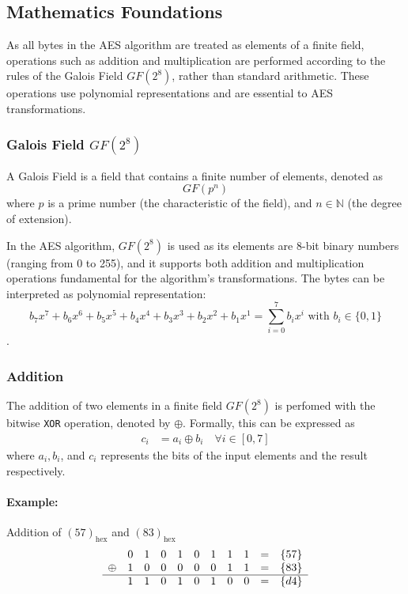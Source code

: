 \subsection{Mathematics Foundations}

As all bytes in the \gls{AES} algorithm are treated as elements of a finite field, operations such as addition and multiplication are performed according to the rules of the Galois Field $GF(2^8)$, rather than standard arithmetic. 
These operations use polynomial representations and are essential to \gls{AES} transformations.


\subsubsection{Galois Field $GF(2^8)$}
\label{sec:gf}

A Galois Field is a field that contains a finite number of elements, denoted as
\begin{equation}
    GF(p^n)
\end{equation}
where $p$ is a prime number (the characteristic of the field), and $n \in \mathbb{N}$ (the degree of extension).

In the AES algorithm, $GF(2^8)$ is used as its elements are 8-bit binary numbers (ranging from 0 to 255), and it supports both addition and multiplication operations fundamental for the algorithm's transformations.
The bytes can be interpreted as polynomial representation:
\begin{equation}
    b_7 x^7 + b_6 x^6 + b_5 x^5 + b_4 x^4 + b_3 x^3 + b_2 x^2 + b_1 x^1 = \sum_{i=0}^7 b_i x^i \text{ with } b_i \in \{0,1\}
    \label{eq:gf2^8}
\end{equation}.


\subsubsection{Addition}
\label{sec:addition}

The addition of two elements in a finite field $GF(2^8)$ is perfomed with the bitwise \texttt{XOR} operation, denoted by $\oplus$.
Formally, this can be expressed as
\begin{align}
    c_i &= a_i \oplus b_i \quad \forall i \in [0, 7]
\end{align}
where $a_i, b_i$, and $c_i$ represents the bits of the input elements and the result respectively.


\paragraph{Example:} Addition of $(57)_{\text{hex}}$ and $(83)_{\text{hex}}$
\[
\begin{array}{ccccccccccc}
     & 0 & 1 & 0 & 1 & 0 & 1 & 1 & 1 & = & \{57\} \\
\oplus & 1 & 0 & 0 & 0 & 0 & 0 & 1 & 1 & = & \{83\} \\
\hline
     & 1 & 1 & 0 & 1 & 0 & 1 & 0 & 0 & = & \{d4\} \\
\end{array}
\]

